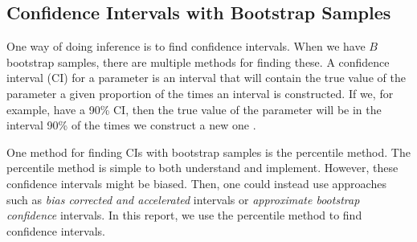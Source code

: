 

\subsection{Confidence Intervals with Bootstrap Samples}
\label{theory_ci_bootstrap}
One way of doing inference is to find confidence intervals. When we have $B$ bootstrap samples, there are multiple methods for finding these.  
A confidence interval (CI) for a parameter is an interval that will contain the true value of the parameter a given proportion of the times an interval is constructed. If we, for example, have a 90\% CI, then the true value of the parameter will be in the interval 90\% of the times we construct a new one \citep{bootstrap}.

One method for finding CIs with bootstrap samples is the percentile method. The percentile method is simple to both understand and implement. However, these confidence intervals might be biased. Then, one could instead use approaches such as \textit{bias corrected and accelerated} intervals or \textit{approximate bootstrap confidence} intervals. In this report, we use the percentile method to find confidence intervals. 

